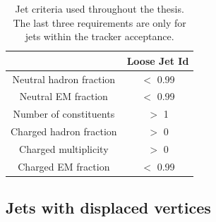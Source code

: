 \begin{table}[h]
	\centering
	\caption{Jet criteria used throughout the thesis. The last three requirements are only for jets within the tracker acceptance.}
	\begin{tabular}{cc}
		\toprule 
		& Loose Jet Id \\ 
		\midrule
		Neutral hadron fraction & $<$ 0.99 \\ 
		
		Neutral EM fraction & $<$ 0.99 \\ 
		
		Number of constituents & $>$ 1 \\ 
		 		
		Charged hadron fraction & $>$ 0 \\ 
	 
		Charged multiplicity & $>$ 0 \\ 
		
		Charged EM fraction & $<$ 0.99 \\ 
		\bottomrule
	\end{tabular} 
	\label{tab:jetID}
\end{table}







\subsection{Jets with displaced vertices }


